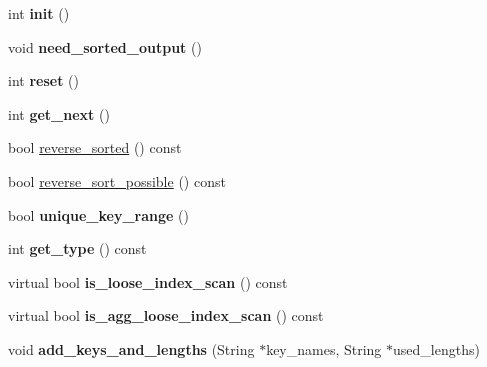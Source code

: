 \begin{DoxyCompactItemize}
int {\bfseries init} ()
\item 
\mbox{\label{classQUICK__GROUP__MIN__MAX__SELECT_aa848df41e9beb6736ddb32bcbf8978e9}} 
void {\bfseries need\+\_\+sorted\+\_\+output} ()
\item 
\mbox{\label{classQUICK__GROUP__MIN__MAX__SELECT_ae2e9a6930eaec2e0663ef82320dca723}} 
int {\bfseries reset} ()
\item 
\mbox{\label{classQUICK__GROUP__MIN__MAX__SELECT_abce1b9e2f8ab2465f5af9b5c666a00e9}} 
int {\bfseries get\+\_\+next} ()
\item 
bool \mbox{\hyperlink{classQUICK__GROUP__MIN__MAX__SELECT_a4e5ee5272e481df74aeca818374c50ec}{reverse\+\_\+sorted}} () const
\item 
bool \mbox{\hyperlink{classQUICK__GROUP__MIN__MAX__SELECT_aa3fd8256056dd72cc9baf46df5fca548}{reverse\+\_\+sort\+\_\+possible}} () const
\item 
\mbox{\label{classQUICK__GROUP__MIN__MAX__SELECT_a2c3ef5a317f8a6a38990e21506beeb8e}} 
bool {\bfseries unique\+\_\+key\+\_\+range} ()
\item 
\mbox{\label{classQUICK__GROUP__MIN__MAX__SELECT_afd617438badf0c045dc42835b96ca028}} 
int {\bfseries get\+\_\+type} () const
\item 
\mbox{\label{classQUICK__GROUP__MIN__MAX__SELECT_aa44f1d0f024a5863927aa9be0ab7f907}} 
virtual bool {\bfseries is\+\_\+loose\+\_\+index\+\_\+scan} () const
\item 
\mbox{\label{classQUICK__GROUP__MIN__MAX__SELECT_ad7b0eb2c2bb7a15da52478bd6f93a99a}} 
virtual bool {\bfseries is\+\_\+agg\+\_\+loose\+\_\+index\+\_\+scan} () const
\item 
\mbox{\label{classQUICK__GROUP__MIN__MAX__SELECT_a403c617baa6fe6b72ac59ed71ea1e8f8}} 
void {\bfseries add\+\_\+keys\+\_\+and\+\_\+lengths} (String $\ast$key\+\_\+names, String $\ast$used\+\_\+lengths)
\item 

\end{DoxyCompactItemize}
